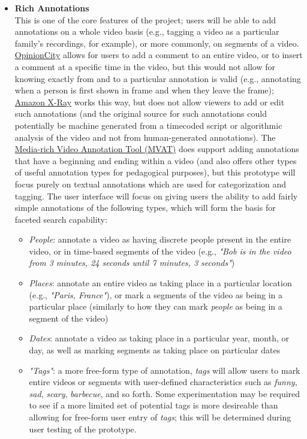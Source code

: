 \begin{itemize}[leftmargin=*]
\item \textbf{Rich Annotations} \\
	This is one of the core features of the project; users will be able to add annotations on a whole video basis (e.g., tagging a video as a particular family's recordings, for example), or more commonly, on segments of a video. \hyperref[sec:priorwork:opinioncity]{OpinionCity} allows for users to add a comment to an entire video, or to insert a comment at a specific time in the video, but this would not allow for knowing exactly from and to a particular annotation is valid (e.g., annotating when a person is first shown in frame and when they leave the frame); \hyperref[sec:priorwork:amazon-x-ray]{Amazon X-Ray} works this way, but does not allow viewers to add or edit such annotations (and the original source for such annotations could potentially be machine generated from a timecoded script or algorithmic analysis of the video and not from human-generated annotations).  The \hyperref[sec:priorwork:media-rich-video-annotation-tool]{Media-rich Video Annotation Tool (MVAT)} does support adding annotations that have a beginning and ending within a video (and also offers other types of useful annotation types for pedagogical purposes), but this prototype will focus purely on textual annotations which are used for categorization and tagging.  The user interface will focus on giving users the ability to add fairly simple annotations of the following types, which will form the basis for faceted search capability:
	\begin{itemize}[noitemsep]
		\item \textit{People}: annotate a video as having discrete people present in the entire video, or in time-based segments of the video (e.g., \textit{"Bob is in the video from 3 minutes, 24 seconds until 7 minutes, 3 seconds"})
		\item \textit{Places}: annotate an entire video as taking place in a particular location (e.g., \textit{"Paris, France"}), or mark a segments of the video as being in a particular place (similarly to how they can mark \textit{people} as being in a segment of the video)
		\item \textit{Dates}: annotate a video as taking place in a particular year, month, or day, as well as marking segments as taking place on particular dates
		\item \textit{"Tags"}: a more free-form type of annotation, \textit{tags} will allow users to mark entire videos or segments with user-defined characteristics such as \textit{funny},  \textit{sad}, \textit{scary}, \textit{barbecue}, and so forth.  Some experimentation may be required to see if a more limited set of potential tags is more desireable than allowing for free-form user entry of \textit{tags}; this will be determined during user testing of the prototype.
	\end{itemize}


\end{itemize}
